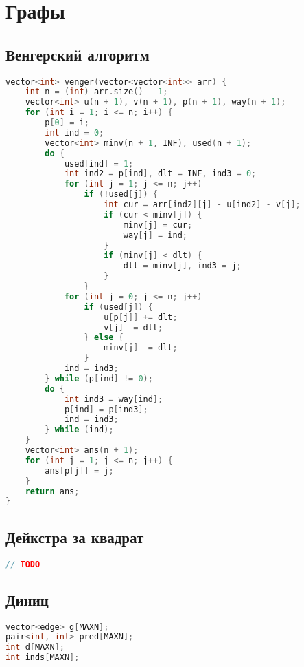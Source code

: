 \documentclass[10pt,a4paper,landscape,twosided]{extarticle}
\begin{document}
\begin{multicols*}{3}
\begin{lstlisting}[language=C++]
\end{lstlisting}

\section{Графы}

\subsection{Венгерский алгоритм}
\begin{lstlisting}[language=C++]
vector<int> venger(vector<vector<int>> arr) {
    int n = (int) arr.size() - 1;
    vector<int> u(n + 1), v(n + 1), p(n + 1), way(n + 1);
    for (int i = 1; i <= n; i++) {
        p[0] = i;
        int ind = 0;
        vector<int> minv(n + 1, INF), used(n + 1);
        do {
            used[ind] = 1;
            int ind2 = p[ind], dlt = INF, ind3 = 0;
            for (int j = 1; j <= n; j++)
                if (!used[j]) {
                    int cur = arr[ind2][j] - u[ind2] - v[j];
                    if (cur < minv[j]) {
                        minv[j] = cur;
                        way[j] = ind;
                    }
                    if (minv[j] < dlt) {
                        dlt = minv[j], ind3 = j;
                    }
                }
            for (int j = 0; j <= n; j++)
                if (used[j]) {
                    u[p[j]] += dlt;
                    v[j] -= dlt;
                } else {
                    minv[j] -= dlt;
                }
            ind = ind3;
        } while (p[ind] != 0);
        do {
            int ind3 = way[ind];
            p[ind] = p[ind3];
            ind = ind3;
        } while (ind);
    }
    vector<int> ans(n + 1);
    for (int j = 1; j <= n; j++) {
        ans[p[j]] = j;
    }
    return ans;
}

\end{lstlisting}

\subsection{Дейкстра за квадрат}
\begin{lstlisting}[language=C++]
// TODO

\end{lstlisting}

\subsection{Диниц}
\begin{lstlisting}[language=C++]
vector<edge> g[MAXN];
pair<int, int> pred[MAXN];
int d[MAXN];
int inds[MAXN];


\end{lstlisting}
\end{multicols*}
\end{document}

